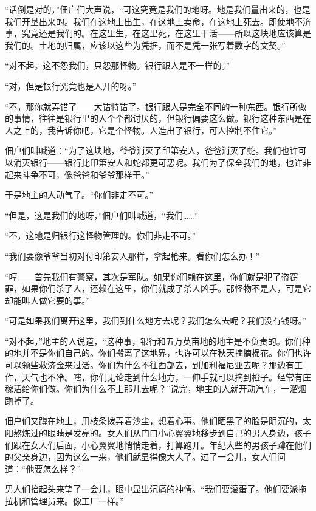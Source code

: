\documentclass[12pt,UTF-8,openany]{ctexbook}
\begin{document}
\begin{normalsize}
    “话倒是对的，”佃户们大声说，“可这究竟是我们的地呀。地是我们量出来的，也是我们开垦出来的。我们在这地上出生，在这地上卖命，在这地上死去。即使地不济事，究竟还是我们的。在这里生，在这里死，在这里干活——所以这块地应该算是我们的。土地的归属，应该以这些为凭据，而不是凭一张写着数字的文契。”
    
    “对不起。这不怨我们，只怨那怪物。银行跟人是不一样的。”
    
    “对，但是银行究竟也是人开的呀。”
    
    “不，那你就弄错了——大错特错了。银行跟人是完全不同的一种东西。银行所做的事情，往往是银行里的人个个都讨厌的，但银行偏要这么做。银行这种东西是在人之上的，我告诉你吧，它是个怪物。人造出了银行，可人控制不住它。”
    
    佃户们叫喊道：“为了这块地，爷爷消灭了印第安人，爸爸消灭了蛇。我们也许可以消灭银行——银行比印第安人和蛇都更可恶呢。我们为了保全我们的地，也许非起来斗争不可，像爸爸和爷爷那样干。”
    
    于是地主的人动气了。“你们非走不可。”
    
    “但是，这是我们的地呀，”佃户们叫喊道，“我们……”
    
    “不，这地是归银行这怪物管理的。你们非走不可。”
    
    “我们要像爷爷当初对付印第安人那样，拿起枪来。看你们怎么办！”
    
    “哼——首先我们有警察，其次是军队。如果你们赖在这里，你们就是犯了盗窃罪，如果你们杀了人，还赖在这里，你们就成了杀人凶手。那怪物不是人，可是它却能叫人做它要的事。”
    
    “可是如果我们离开这里，我们到什么地方去呢？我们怎么去呢？我们没有钱呀。”
    
    “对不起，”地主的人说道，“这种事，银行和五万英亩地的地主是不负责的。你们种的地并不是你们自己的。你们搬离了这地界，也许可以在秋天摘摘棉花。你们也许可以领些救济金来过活。你们为什么不往西部去，到加利福尼亚去呢？那边有工作，天气也不冷。嗐，你们无论走到什么地方，一伸手就可以摘到橙子。经常有庄稼活给你们做。你们为什么不上那儿去呢？”说完，地主的人就开动汽车，一溜烟跑掉了。
    
    佃户们又蹲在地上，用枝条拨弄着沙尘，想着心事。他们晒黑了的脸是阴沉的，太阳熬炼过的眼睛是发亮的。女人们从门口小心翼翼地移步到自己的男人身边，孩子们跟在女人们后面，小心翼翼地悄悄走着，打算跑开。年纪大些的男孩子蹲在他们的父亲身边，因为这么一来，他们就显得像大人了。过了一会儿，女人们问道：“他要怎么样？”
    
    男人们抬起头来望了一会儿，眼中显出沉痛的神情。“我们要滚蛋了。他们要派拖拉机和管理员来。像工厂一样。”
    

\end{normalsize}
\end{document}
